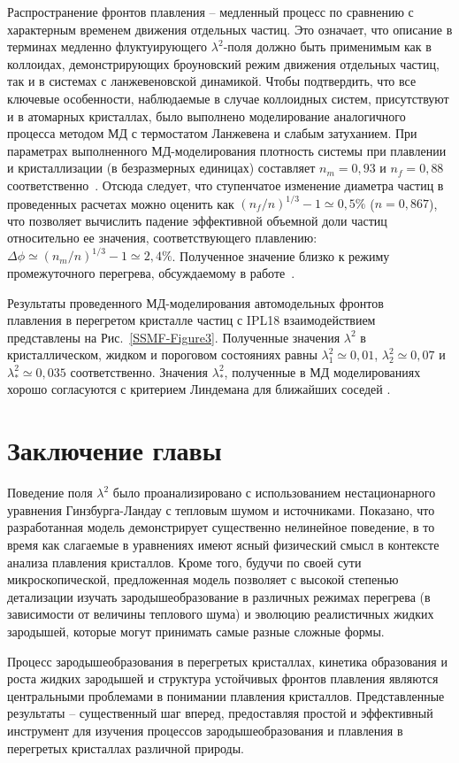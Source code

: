 Распространение фронтов плавления -- медленный процесс по сравнению с характерным временем движения отдельных частиц.
Это означает, что описание в терминах медленно флуктуирующего $\lambda^2$-поля должно быть применимым как в коллоидах, демонстрирующих броуновский режим движения отдельных частиц, так и в системах с ланжевеновской динамикой.
Чтобы подтвердить, что все ключевые особенности, наблюдаемые в случае коллоидных систем, присутствуют и в атомарных кристаллах, было выполнено моделирование аналогичного процесса методом МД с термостатом Ланжевена и слабым затуханием.
При параметрах выполненного МД-моделирования плотность системы при плавлении и кристаллизации (в безразмерных единицах) составляет $ n_m = 0{,}93 $ и $ n_f = 0{,}88 $ соответственно~\cite{10.1080/00268979500100911}.
Отсюда следует, что ступенчатое изменение диаметра частиц в проведенных расчетах можно оценить как $ (n_f / n) ^ {1/3} -1 \simeq 0{,}5 \% $ ($ n = 0{,}867 $), что позволяет вычислить падение эффективной объемной доли частиц относительно ее значения, соответствующего плавлению:
$\Delta \phi  \simeq (n_m/n)^{1/3}-1\simeq 2{,}4\%$.
Полученное значение близко к режиму промежуточного перегрева, обсуждаемому в работе~\cite{10.1038/ncomms7942}.


Результаты проведенного МД-моделирования автомодельных фронтов \\ плавления в перегретом кристалле частиц с IPL18 взаимодействием представлены на Рис.~\ref{SSMF-Figure3}.
Полученные значения $\lambda^2$ в кристаллическом, жидком и пороговом состояниях равны $\lambda_1^2 \simeq 0{,}01$, $\lambda_2^2 \simeq 0{,}07$ и $\lambda_\ast^2 \simeq 0{,}035$ соответственно.
Значения $\lambda_\ast^2$, полученные в МД моделированиях хорошо согласуются с критерием Линдемана для ближайших соседей \cite{10.1016/0375-9601(85)90617-6}.


\section{Заключение главы}

Поведение поля $\lambda^2$ было проанализировано с использованием нестационарного уравнения Гинзбурга-Ландау с тепловым шумом и источниками.
Показано, что разработанная модель демонстрирует существенно нелинейное поведение, в то время как слагаемые в уравнениях имеют ясный физический смысл в контексте анализа плавления кристаллов.
Кроме того, будучи по своей сути микроскопической, предложенная модель позволяет с высокой степенью детализации изучать зародышеобразование в различных режимах перегрева (в зависимости от величины теплового шума) и эволюцию реалистичных жидких зародышей, которые могут принимать самые разные сложные формы.

Процесс зародышеобразования в перегретых кристаллах, кинетика образования и роста жидких зародышей и структура устойчивых фронтов плавления являются центральными проблемами в понимании плавления кристаллов.
Представленные результаты -- существенный шаг вперед, предоставляя простой и эффективный инструмент для изучения процессов зародышеобразования и плавления в перегретых кристаллах различной природы.
